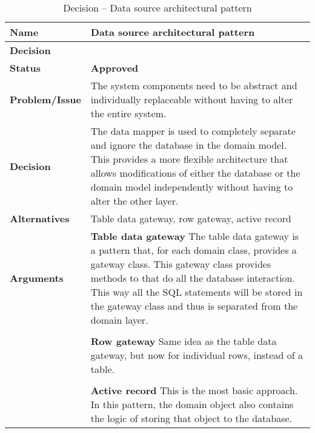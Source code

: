 \begin{table}[H]
	\begin{tabular}{L{0.2\textwidth} L{0.6\textwidth}}
		\textbf{Name} 			& \textbf{Data source architectural pattern} \\ \toprule
		\textbf{Decision} 		&  \\ \midrule \midrule
		\textbf{Status} 		& \textbf{Approved} \\ \midrule
		\textbf{Problem/Issue} 	& The system components need to be abstract and individually replaceable without having to alter the entire system. \\
		\midrule
		\textbf{Decision} 		&  The data mapper \cite{Fowler:2002:PEA:579257} is used to completely separate and ignore the database in the domain model. This provides a more flexible architecture that allows modifications of either the database or the domain model independently without having to alter the other layer. \\ \midrule
		\textbf{Alternatives} 	& Table data gateway, row gateway, active record \\ \midrule
		\textbf{Arguments} 		&
			\textbf{Table data gateway} The table data gateway is a pattern that, for each domain class, provides a gateway class. This gateway class provides methods to that do all the database interaction. This way all the SQL statements will be stored in the gateway class and thus is separated from the domain layer. \\\\
			& \textbf{Row gateway} Same idea as the table data gateway, but now for individual rows, instead of a table. \\\\
			& \textbf{Active record} This is the most basic approach. In this pattern, the domain object also contains the logic of storing that object to the database.
	\\ \bottomrule
	\end{tabular}
	\caption{Decision -- Data source architectural pattern}
	\label{table:linux}
\end{table}


